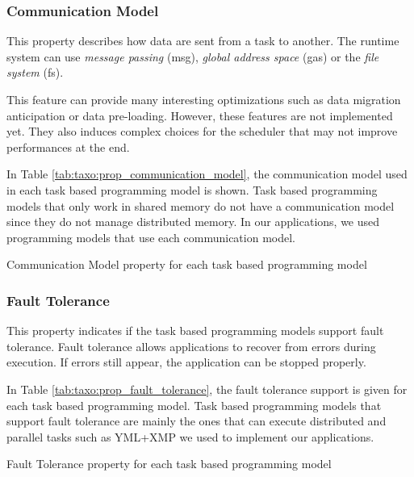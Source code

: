 \subsubsection{Communication Model}
This property describes how data are sent from a task to another.
The runtime system can use \textit{message passing} (msg), \textit{global address space} (gas) or the \textit{file system} (fs).

This feature can provide many interesting optimizations such as data migration anticipation or data pre-loading.
However, these features are not implemented yet.
They also induces complex choices for the scheduler that may not improve performances at the end.

In Table \ref{tab:taxo:prop_communication_model}, the communication model used in each task based programming model is shown.
Task based programming models that only work in shared memory do not have a communication model since they do not manage distributed memory.
In our applications, we used programming models that use each communication model.

\begin{table}[H]
	\caption{Communication Model property for each task based programming model \label{tab:taxo:prop_communication_model}}
	\centering
	\begin{multicols}{2}
		

		
	\end{multicols}
\end{table}

\subsubsection{Fault Tolerance}
This property indicates if the task based programming models support fault tolerance.
Fault tolerance allows applications to recover from errors during execution.
If errors still appear, the application can be stopped properly.

In Table \ref{tab:taxo:prop_fault_tolerance}, the fault tolerance support is given for each task based programming model.
Task based programming models that support fault tolerance are mainly the ones that can execute distributed and parallel tasks such as YML+XMP we used to implement our applications.

\begin{table}[H]
	\caption{Fault Tolerance property for each task based programming model \label{tab:taxo:prop_fault_tolerance}}
	\centering
	\begin{multicols}{2}
		

		
	\end{multicols}
\end{table}

